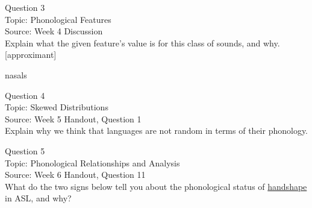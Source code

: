 \documentclass[12pt]{article}
\begin{document}
{\large Question 3}\\

Topic: Phonological Features\\
Source: Week 4 Discussion\\

Explain what the given feature’s value is for this class of sounds, and why.\\

{[approximant]}

nasals


\newpage

{\large Question 4}\\

Topic: Skewed Distributions\\
Source: Week 5 Handout, Question 1\\

Explain why we think that languages are not random in terms of their phonology.\\


\newpage

{\large Question 5}\\

Topic: Phonological Relationships and Analysis\\
Source: Week 6 Handout, Question 11\\

What do the two signs below tell you about the phonological status of \underline{handshape} in ASL, and why?\\
\end{document}
